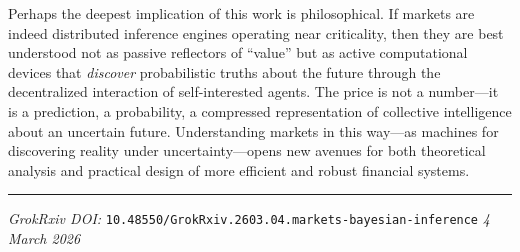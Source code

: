 \documentclass[12pt,a4paper]{article}
\theoremstyle{definition}
\begin{document}
Perhaps the deepest implication of this work is philosophical. If markets are indeed distributed inference engines operating near criticality, then they are best understood not as passive reflectors of ``value'' but as active computational devices that \emph{discover} probabilistic truths about the future through the decentralized interaction of self-interested agents. The price is not a number---it is a prediction, a probability, a compressed representation of collective intelligence about an uncertain future. Understanding markets in this way---as machines for discovering reality under uncertainty---opens new avenues for both theoretical analysis and practical design of more efficient and robust financial systems.

\vspace{1em}
\noindent\rule{\textwidth}{0.5pt}
\noindent\textit{GrokRxiv DOI:} \texttt{10.48550/GrokRxiv.2603.04.markets-bayesian-inference}
\hfill \textit{4 March 2026}


\end{document}
